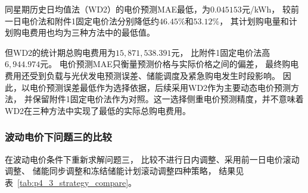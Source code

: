 \begin{table}[H]
\centering
\caption{不同电价预测方法下问题二的统计期计算结果}
\label{tab:p4_2_price_compare}
\end{table}

同星期历史日均值法（WD2）的电价预测MAE最低，为$0.045153$元/kWh，
较前一日电价法和附件1固定电价法分别降低约$46.45\%$和$53.12\%$，
其计划购电量和计划购电费用也均为三种方法中的最低值。

但WD2的统计期总购电费用为$15,871,538.391$元，
比附件1固定电价法高$6,944.974$元。
电价预测MAE只衡量预测价格与实际价格之间的偏差，
最终购电费用还受到负载与光伏发电预测误差、储能调度及紧急购电发生时段影响。
因此，以电价预测误差最低作为选择依据，后续采用WD2作为主要动态电价预测方法，
并保留附件1固定电价法作为对照。这一选择侧重电价预测精度，并不意味着WD2在三种方法中实现了最低的实际总购电费用。


\subsubsection{波动电价下问题三的比较}

在波动电价条件下重新求解问题三，
比较不进行日内调整、采用前一日电价滚动调整、
储能同步调整和冻结储能计划滚动调整四种策略，
结果见表~\ref{tab:p4_3_strategy_compare}。

